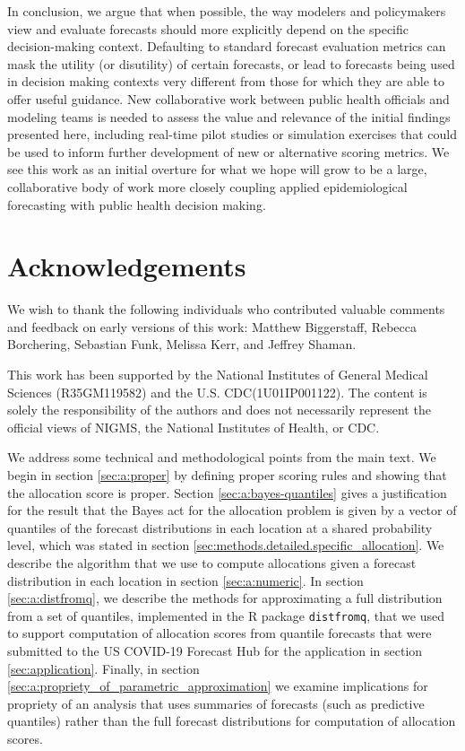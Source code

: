 \documentclass{article}\usepackage[]{graphicx}\usepackage[]{xcolor}
\begin{document}
In conclusion, we argue that when possible, the way modelers and policymakers view and evaluate forecasts should more explicitly depend on
the specific decision-making context. Defaulting to standard forecast evaluation metrics can mask the utility (or
disutility) of certain forecasts, or lead to forecasts being used in decision making contexts very different from those
for which they are able to offer useful guidance. New collaborative work between public health officials and modeling teams is
needed to assess the value and relevance of the initial findings presented here, including real-time pilot studies or
simulation exercises that could be used to inform further development of new or alternative scoring metrics. We see this
work as an initial overture for what we hope will grow to be a large, collaborative body of work more closely coupling
applied epidemiological forecasting with public health decision making.

\section*{Acknowledgements}

We wish to thank the following individuals who contributed valuable comments and feedback on early versions of this
work: Matthew Biggerstaff, Rebecca Borchering, Sebastian Funk, Melissa Kerr, and Jeffrey Shaman.

This work has been supported by the National Institutes of General Medical Sciences (R35GM119582) and the U.S.
CDC(1U01IP001122). The content is solely the responsibility of the authors and does not necessarily represent the
official views of NIGMS, the National Institutes of Health, or CDC.

\appendix
\appendixpage
\addappheadtotoc

We address some technical and methodological points from the main text. We begin in section \ref{sec:a:proper} by defining
proper scoring rules and showing that the allocation score is proper. Section \ref{sec:a:bayes-quantiles} gives a
justification for the result that the Bayes act for the allocation problem is given by a vector of quantiles of the
forecast distributions in each location at a shared probability level, which was stated in section
\ref{sec:methods.detailed.specific_allocation}. We describe the algorithm that we use to compute allocations given a
forecast distribution in each location in section \ref{sec:a:numeric}. In section \ref{sec:a:distfromq}, we describe the
methods for approximating a full distribution from a set of quantiles, implemented in the R package \verb`distfromq`,
that we used to support computation of allocation scores from quantile forecasts that were submitted to the US COVID-19
Forecast Hub for the application in section \ref{sec:application}. Finally, in section
\ref{sec:a:propriety_of_parametric_approximation} we examine implications for propriety of an analysis that uses summaries
of forecasts (such as predictive quantiles) rather than the full forecast distributions for computation of allocation
scores.
\end{document}
